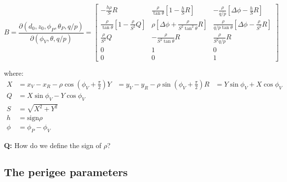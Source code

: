 \begin{equation}
B =  \frac{\partial (d_0, z_0, \phi_P, \theta_P, q/p)}{\partial (\phi_V, \theta, q/p)} = 
\begin{bmatrix}
- \frac{h \rho}{S} R & \frac{\rho}{\tan \theta} \left[ 1 - \frac{h}{S} R \right]  & - \frac{\rho}{q/p} \left[ \Delta \phi - \frac{h}{S} R  \right]  \\
\frac{\rho}{\tan \theta}  \left[ 1 - \frac{\rho}{S^2} Q \right] & \rho \left[ \Delta \phi + \frac{\rho}{S^2 \tan^2 \theta } R \right] & \frac{\rho}{q/p \tan \theta}\left[ \Delta \phi - \frac{\rho}{S^2} R \right] \\
\frac{\rho}{S^2} Q & - \frac{\rho}{S^2 \tan \theta}   R & \frac{\rho}{S^2 q/p}   R \\
0 & 1 & 0 \\
0 & 0 & 1 
\end{bmatrix}
\end{equation}


where:
\begin{align*}
X &= x_V - x_R - \rho \cos \left(\phi_V + \frac{\pi}{2} \right) 
Y &= y_V - y_R - \rho \sin \left( \phi_V + \frac{\pi}{2}\right)
R &= Y \sin \phi_V + X \cos \phi_V \\
Q &= X \sin \phi_V - Y \cos \phi_V \\
S &= \sqrt{X^2 + Y^2} \\
h &= \text{sign}  \rho \\
\phi &= \phi_P - \phi_V
\end{align*}

\textbf{Q:} How do we define the sign of $\rho$?

\subsection{The perigee parameters}